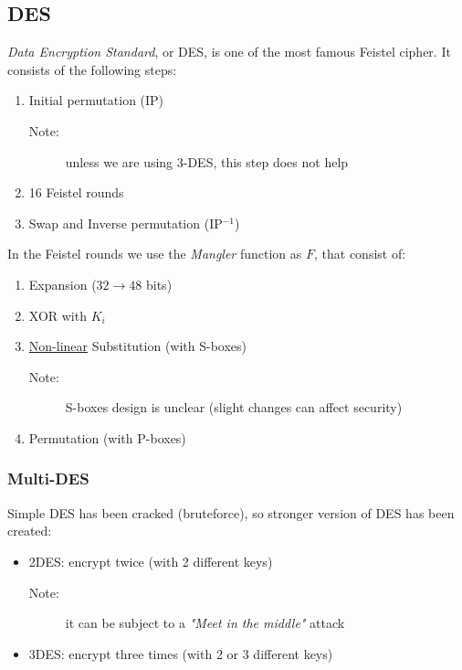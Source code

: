 \subsection{DES}
\textit{Data Encryption Standard}, or DES, is one of the most famous Feistel cipher. It consists of the following steps:
\begin{enumerate}
    \item Initial permutation (IP)
    \begin{description}
    \item[Note:] unless we are using 3-DES, this step does not help
    \end{description}
    \item 16 Feistel rounds
    \item Swap and Inverse permutation (IP$^{-1}$)
\end{enumerate}
In the Feistel rounds we use the \textit{Mangler} function as $F$, that consist of:
\begin{enumerate}
    \item Expansion ($32\rightarrow 48$ bits)
    \item XOR with $K_i$
    \item \underline{Non-linear} Substitution (with S-boxes)
    \begin{description}
    \item[Note:] S-boxes design is unclear (slight changes can affect security)
    \end{description}
    \item Permutation (with P-boxes)
\end{enumerate}
\subsubsection{Multi-DES}
Simple DES has been cracked (bruteforce), so stronger version of DES has been created:
\begin{itemize}
    \item 2DES: encrypt twice (with 2 different keys)
    \begin{description}
    \item[Note:] it can be subject to a \textit{"Meet in the middle"} attack
    \end{description}
    \item 3DES: encrypt three times (with 2 or 3 different keys)
\end{itemize}
